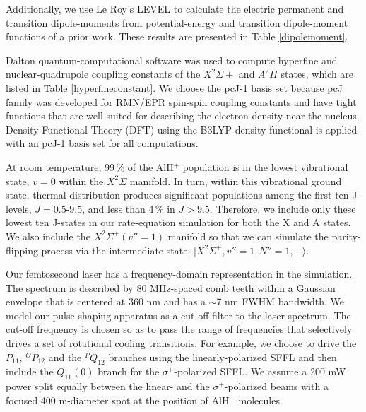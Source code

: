 \documentclass[nofootinbib,aip,jcp,reprint]{revtex4-1}
\begin{document}
Additionally, we use Le Roy's LEVEL\cite{le2017level} to calculate the electric permanent and transition dipole-moments from potential-energy and transition dipole-moment functions of a prior work\cite{nguyen2011challenges}. These results are presented in Table \ref{dipolemoment}.

Dalton\cite{daltonpaper, daltonwebpage} quantum-computational software was used to compute hyperfine and nuclear-quadrupole coupling constants of the $X^2\Sigma+$ and $A^2\Pi$ states, which are listed in Table \ref{hyperfineconstant}. We choose the pcJ-1 basis set because pcJ family was developed for RMN/EPR spin-spin coupling constants and have tight functions that are well suited for describing the electron density near the nucleus. Density Functional Theory (DFT) using the B3LYP density functional is applied with an pcJ-1 basis set for all computations.

At room temperature, 99$\, \%$ of the AlH$^+$ population is in the lowest vibrational state, $v=0$ within the $X^2 \Sigma$ manifold. In turn, within this vibrational ground state, thermal distribution produces significant populations among the first ten J-levels, $J=0.5$-$9.5$, and less than 4$\, \%$ in $J>9.5$. Therefore, we include only these lowest ten J-states in our rate-equation simulation for both the X and A states. We also include the $X^2\Sigma^+ (v''=1)$ manifold so that we can simulate the parity-flipping process via the intermediate state, $\lvert X^2\Sigma^+, v''=1, N''=1, -\rangle$.

Our femtosecond laser has a frequency-domain representation in the simulation. The spectrum is described by 80 MHz-spaced comb teeth within a Gaussian envelope that is centered at 360 nm and has a $\sim$7 nm FWHM bandwidth. We model our pulse shaping apparatus as a cut-off filter to the laser spectrum. The cut-off frequency is chosen so as to pass the range of frequencies that selectively drives a set of rotational cooling transitions. For example, we choose to drive the $P_{11}$, $^OP_{12}$ and the $^PQ_{12}$ branches using the linearly-polarized SFFL and then include the $Q_{11}(0)$ branch for the $\sigma^+$-polarized SFFL. We assume a 200 mW power split equally between the linear- and the $\sigma^+$-polarized beams with a focused 400 {\micro}m-diameter spot at the position of AlH$^+$ molecules.
\end{document}
